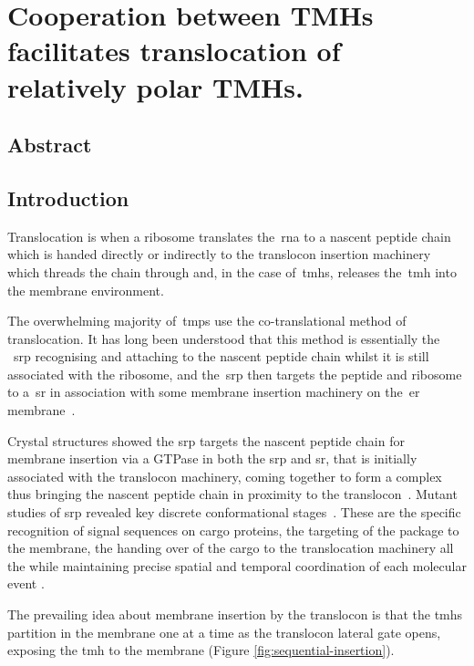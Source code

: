 \chapter{Cooperation between TMHs facilitates translocation of relatively polar TMHs.}
\section{Abstract}
\section{Introduction}

Translocation is when a ribosome translates the~\gls{rna} to a nascent peptide chain which is handed directly or indirectly to the translocon insertion machinery which threads the chain through and, in the case of~\gls{tmh}s, releases the~\gls{tmh} into the membrane environment.

The overwhelming majority of~\gls{tmp}s use the co-translational method of translocation.
It has long been understood that this method is essentially the ~\gls{srp} recognising and attaching to the nascent peptide chain whilst it is still associated with the ribosome, and the~\gls{srp} then targets the peptide and ribosome to a~\gls{sr} in association with some membrane insertion machinery on the~\gls{er} membrane~\cite{Pool2005, Hessa2005}.

Crystal structures showed the \gls{srp} targets the nascent peptide chain for membrane insertion via a GTPase in both the \gls{srp} and \gls{sr}, that is initially associated with the translocon machinery, coming together to form a complex thus bringing the nascent peptide chain in proximity to the translocon~\cite{Shan2005}.
Mutant studies of \gls{srp} revealed key discrete conformational stages~\cite{Shan2005}.
These are the specific recognition of signal sequences on cargo proteins, the targeting of the package to the membrane, the handing over of the cargo to the translocation machinery all the while maintaining precise spatial and temporal coordination of each molecular event \cite{Saraogi2011}.



The prevailing idea about membrane insertion by the translocon is that the \gls{tmh}s partition in the membrane one at a time as the translocon lateral gate opens, exposing the \gls{tmh} to the membrane (Figure \ref{fig:sequential-insertion})\cite{Cymer2015}.

